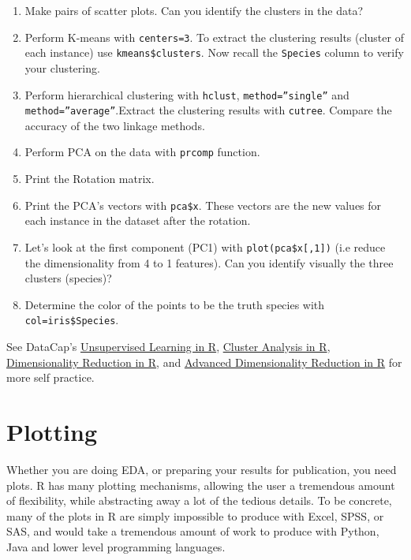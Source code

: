\documentclass[]{book}
\providecommand{\tightlist}{%
  \setlength{\itemsep}{0pt}\setlength{\parskip}{0pt}}
\theoremstyle{definition}
\theoremstyle{definition}
\theoremstyle{definition}
\theoremstyle{remark}
\begin{document}
\begin{enumerate}
  \begin{enumerate}
  \def\labelenumii{\arabic{enumii}.}
  \tightlist
  \item
    Make pairs of scatter plots. Can you identify the clusters in the
    data?
  \item
    Perform K-means with \texttt{centers=3}. To extract the clustering
    results (cluster of each instance) use \texttt{kmeans\$clusters}.
    Now recall the \texttt{Species} column to verify your clustering.
  \item
    Perform hierarchical clustering with \texttt{hclust},
    \texttt{method=”single”} and \texttt{method=”average”}.Extract the
    clustering results with \texttt{cutree}. Compare the accuracy of the
    two linkage methods.
  \item
    Perform PCA on the data with \texttt{prcomp} function.
  \item
    Print the Rotation matrix.
  \item
    Print the PCA's vectors with \texttt{pca\$x}. These vectors are the
    new values for each instance in the dataset after the rotation.
  \item
    Let's look at the first component (PC1) with
    \texttt{plot(pca\$x{[},1{]})} (i.e reduce the dimensionality from 4
    to 1 features). Can you identify visually the three clusters
    (species)?\\
  \item
    Determine the color of the points to be the truth species with
    \texttt{col=iris\$Species}.
  \end{enumerate}
\end{enumerate}

See DataCap's
\href{https://www.datacamp.com/courses/unsupervised-learning-in-r}{Unsupervised
Learning in R},
\href{https://www.datacamp.com/courses/cluster-analysis-in-r}{Cluster
Analysis in R},
\href{https://www.datacamp.com/courses/dimensionality-reduction-in-r}{Dimensionality
Reduction in R}, and
\href{https://www.datacamp.com/courses/advanced-dimensionality-reduction-in-r}{Advanced
Dimensionality Reduction in R} for more self practice.

\hypertarget{plotting}{\chapter{Plotting}\label{plotting}}

Whether you are doing EDA, or preparing your results for publication,
you need plots. R has many plotting mechanisms, allowing the user a
tremendous amount of flexibility, while abstracting away a lot of the
tedious details. To be concrete, many of the plots in R are simply
impossible to produce with Excel, SPSS, or SAS, and would take a
tremendous amount of work to produce with Python, Java and lower level
programming languages.
\end{document}
